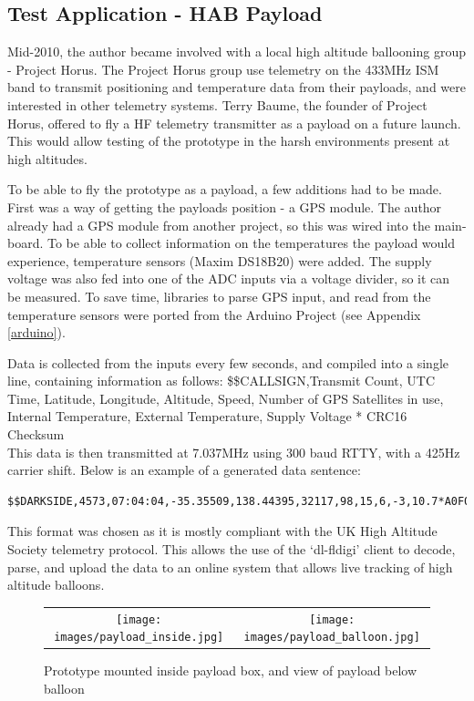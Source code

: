 \documentclass[a4paper,12pt]{article}
\begin{document}
\subsection{Test Application - HAB Payload}
Mid-2010, the author became involved with a local high altitude ballooning group - Project Horus. The Project Horus group use telemetry on the 433MHz ISM band to transmit positioning and temperature data from their payloads, and were interested in other telemetry systems. Terry Baume, the founder of Project Horus, offered to fly a HF telemetry transmitter as a payload on a future launch. This would allow testing of the prototype in the harsh environments present at high altitudes. 

To be able to fly the prototype as a payload, a few additions had to be made. First was a way of getting the payloads position - a GPS module. The author already had a GPS module from another project, so this was wired into the main-board. To be able to collect information on the temperatures the payload would experience, temperature sensors (Maxim DS18B20) were added. The supply voltage was also fed into one of the ADC inputs via a voltage divider, so it can be measured. To save time, libraries to parse GPS input, and read from the temperature sensors were ported from the Arduino Project (see Appendix \ref{arduino}).

Data is collected from the inputs every few seconds, and compiled into a single line, containing information as follows:
\$\$CALLSIGN,Transmit Count, UTC Time, Latitude, Longitude, Altitude, Speed, Number of GPS Satellites in use, Internal Temperature, External Temperature, Supply Voltage * CRC16 Checksum\\
This data is then transmitted at 7.037MHz using 300 baud RTTY, with a 425Hz carrier shift.
Below is an example of a generated data sentence:
\begin{verbatim}
$$DARKSIDE,4573,07:04:04,-35.35509,138.44395,32117,98,15,6,-3,10.7*A0F0
\end{verbatim}

This format was chosen as it is mostly compliant with the UK High Altitude Society telemetry protocol\citep{ref:ukhas}. This allows the use of the `dl-fldigi' client to decode, parse, and upload the data to an online system that allows live tracking of high altitude balloons.

\begin{figure}[h]
  \begin{center}
  \begin{tabular}{cc}
    \texttt{[image: images/payload\_inside.jpg]} &
    \texttt{[image: images/payload\_balloon.jpg]}\\
  \end{tabular}
  \end{center}
  \caption{Prototype mounted inside payload box, and view of payload below balloon}
  \label{fig:payload_inside}
\end{figure}
\end{document}
